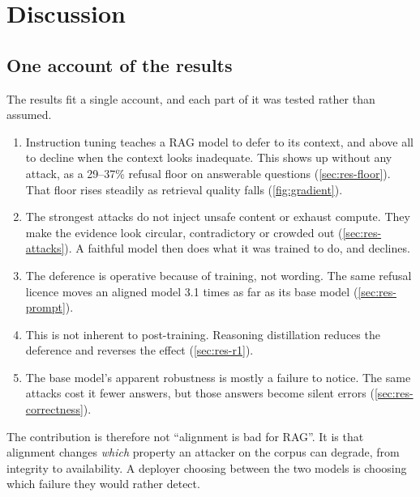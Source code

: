 \chapter{Discussion}
\label{ch:discussion}

\section{One account of the results}
\label{sec:story}

The results fit a single account, and each part of it was tested rather than
assumed.

\begin{enumerate}
  \item Instruction tuning teaches a RAG model to defer to its context, and
    above all to decline when the context looks inadequate. This shows up
    without any attack, as a 29--37\% refusal floor on answerable questions
    (\cref{sec:res-floor}). That floor rises steadily as retrieval quality
    falls (\cref{fig:gradient}).
  \item The strongest attacks do not inject unsafe content or exhaust compute.
    They make the evidence look circular, contradictory or crowded out
    (\cref{sec:res-attacks}). A faithful model then does what it was trained to
    do, and declines.
  \item The deference is operative because of training, not wording. The same
    refusal licence moves an aligned model 3.1 times as far as its base model
    (\cref{sec:res-prompt}).
  \item This is not inherent to post-training. Reasoning distillation reduces
    the deference and reverses the effect (\cref{sec:res-r1}).
  \item The base model's apparent robustness is mostly a failure to notice.
    The same attacks cost it fewer answers, but those answers become silent
    errors (\cref{sec:res-correctness}).
\end{enumerate}

The contribution is therefore not ``alignment is bad for RAG''. It is that
alignment changes \emph{which} property an attacker on the corpus can degrade,
from integrity to availability. A deployer choosing between the two models is
choosing which failure they would rather detect.



